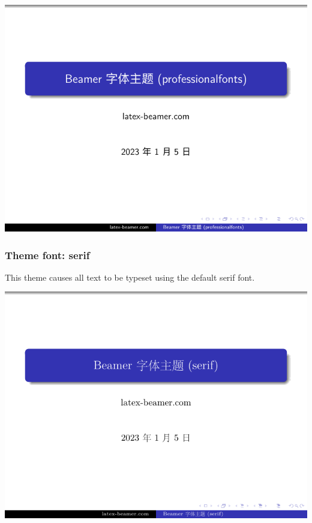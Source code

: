 \includegraphics[page=2]{examples/beamer/beamerfont06.pdf}

\subsubsection{Theme font: {\ttfamily serif}}

This theme causes all text to be typeset using the default serif font.

\includegraphics[page=1]{examples/beamer/beamerfont07.pdf}


